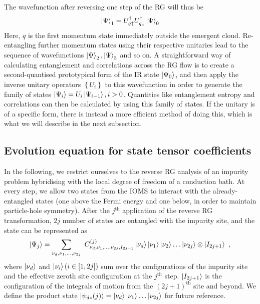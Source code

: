 The wavefunction after reversing one step of the RG will thus be
\begin{equation}\begin{aligned}
	\ket{\Psi}_1 = U^\dagger_{q \uparrow}U^\dagger_{q \downarrow}\ket{\Psi}_0
\end{aligned}\end{equation}
Here, \(q\) is the first momentum state immediately outside the emergent cloud. Re-entangling further momentum states using their respective unitaries lead to the sequence of wavefunctions \(\ket{\Psi}_2, \ket{\Psi}_3\) and so on.
A straightforward way of calculating entanglement and correlations across the RG flow is to create a second-quantised prototypical form of the IR state \(\ket{\Psi_0}\), and then apply the inverse unitary operators \(\left\{ U_i \right\} \) to this wavefunction in order to generate the family of states \(\ket{\Psi_i} = U_i \ket{\Psi_{i-1}}, i > 0\). Quantities like entanglement entropy and correlations can then be calculated by using this family of states. If the unitary is of a specific form, there is instead a more efficient method of doing this, which is what we will describe in the next subsection.

\subsection{Evolution equation for state tensor coefficients}
In the following, we restrict ourselves to the reverse RG analysis of an impurity problem hybridising with the local degree of freedom of a conduction bath. At every step, we allow two states from the IOMS to interact with the already-entangled states (one above the Fermi energy and one below, in order to maintain particle-hole symmetry). After the \(j^\text{th}\) application of the reverse RG transformation, \(2j\) number of states are entangled with the impurity site, and the state can be represented as
\begin{equation}\begin{aligned}\label{zerothSiteRep}
	\ket{\Psi_j} = \sum_{\nu_d,\nu_1,\ldots,\nu_{2j}}~C^{(j)}_{\nu_d,\nu_1,\ldots,\nu_{2j},I_{2j+1}}\ket{\nu_d}\ket{\nu_1}\ket{\nu_2}\ldots\ket{\nu_{2j}}\otimes\ket{I_{2j+1}}~,
\end{aligned}\end{equation}
where \(\ket{\nu_d}\) and \(\ket{\nu_i} (i \in [1, 2j])\) sum over the configurations of the impurity site and the effective zeroth site configuration at the \(j^\text{th}\) step. \(\ket{I_{2j+1}}\) is the configuration of the integrals of motion from the \((2j+1)^\text{th}\) site and beyond. We define the product state \(\ket{\psi_{dz}(j)} = \ket{\nu_d}\ket{\nu_1}\ldots\ket{\nu_{2j}}\) for future reference.

